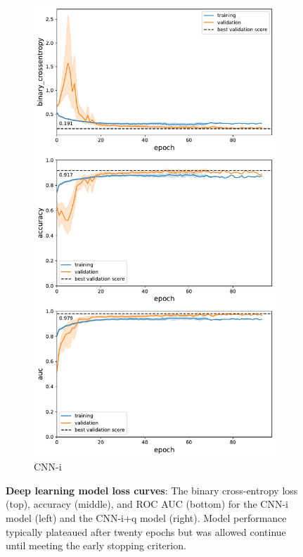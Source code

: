 \documentclass[fleqn,10pt]{wlscirep}
\begin{document}
\begin{figure}[tbp]
\begin{subfigure}[t]{0.5\textwidth}
    \includegraphics[width=0.9\linewidth]{deep-learning-qc/dl_learning_curve_without_qc.pdf}
    \caption{CNN-i}
    \label{fig:dl-loss:imaging}
    \end{subfigure}
    \caption{%
        {\bf Deep learning model loss curves}:
        The binary cross-entropy loss (top), accuracy (middle), and ROC AUC
        (bottom) for the CNN-i model (left) and the CNN-i+q model (right). Model
        performance typically plateaued after twenty epochs but was allowed
        continue until meeting the early stopping criterion.
    }
    \label{fig:dl-loss}
\end{figure}
\end{document}
